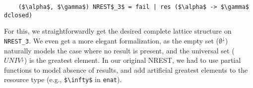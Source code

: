 \documentclass[acmsmall]{acmart}
\newcommand{\is}{\lstinline[language=isabelle]}
\newcommand{\cf}{cf.\xspace}
\begin{document}

\begin{lstlisting}
    ($\alpha$, $\gamma$) NREST$_3$ = fail | res ($\alpha$ -> $\gamma$ dclosed)
\end{lstlisting}

For this, we straightforwardly get the desired complete lattice structure on \is{NREST_3}.
We even get a more elegant formalization, as
the empty set ($\emptyset^\downarrow$) naturally models the case where no result is present, and the universal set ($UNIV^\downarrow$) is the greatest element. In our original NREST, we had to use partial functions to model absence of results, and add artificial greatest elements to the resource type (e.g., \is{$\infty$} in \is{enat}).


%




\end{document}
